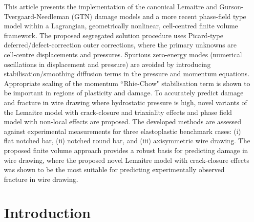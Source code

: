 \documentclass[sn-mathphys,Numbered,draft]{sn-jnl}%
\begin{document}
\abstract
{
This article presents the implementation of the canonical Lemaitre and Gurson-Tvergaard-Needleman (GTN) damage models and a more recent phase-field type model within a Lagrangian, geometrically nonlinear, cell-centred finite volume framework.
The proposed segregated solution procedure uses Picard-type deferred/defect-correction outer corrections, where the primary unknowns are cell-centre displacements and pressures.
Spurious zero-energy modes (numerical oscillations in displacement and pressure) are avoided by introducing stabilisation/smoothing diffusion terms in the pressure and momentum equations.
Appropriate scaling of the momentum ``Rhie-Chow" stabilisation term is shown to be important in regions of plasticity and damage.
To accurately predict damage and fracture in wire drawing where hydrostatic pressure is high, novel variants of the Lemaitre model with crack-closure and triaxiality effects and phase field model with non-local effects are proposed.
The developed methods are assessed against experimental measurements for three elastoplastic benchmark cases: (i) flat notched bar, (ii) notched round bar, and (iii) axisymmetric wire drawing.
The proposed finite volume approach provides a robust basis for predicting damage in wire drawing, where the proposed novel Lemaitre model with crack-closure effects was shown to be the most suitable for predicting experimentally observed fracture in wire drawing.
}




\maketitle


\section{Introduction}\label{sec:intro}
\end{document}
